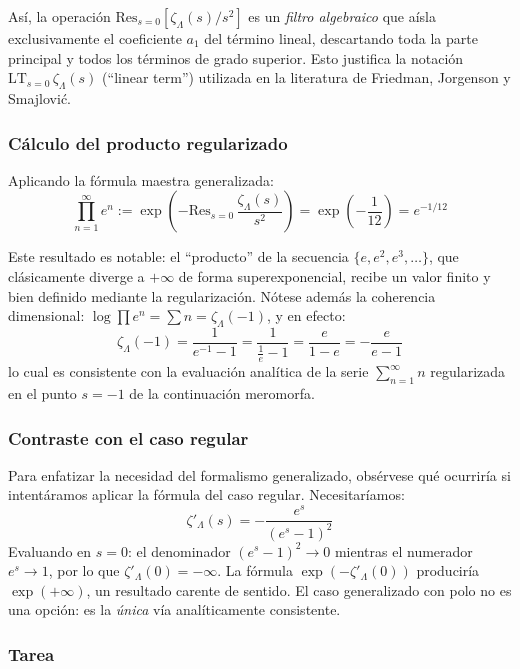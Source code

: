 Así, la operación $\text{Res}_{s=0}[\zeta_\Lambda(s)/s^2]$ es un \textit{filtro algebraico} que aísla exclusivamente el coeficiente $a_1$ del término lineal, descartando toda la parte principal y todos los términos de grado superior. Esto justifica la notación $\text{LT}_{s=0}\,\zeta_\Lambda(s)$ (``linear term'') utilizada en la literatura de Friedman, Jorgenson y Smajlovi\'c.

\subsubsection*{Cálculo del producto regularizado}

Aplicando la fórmula maestra generalizada:
$$ \prod_{n=1}^{\infty} e^n := \exp\!\left(-\text{Res}_{s=0}\,\frac{\zeta_\Lambda(s)}{s^2}\right) = \exp\!\left(-\frac{1}{12}\right) = e^{-1/12} $$

Este resultado es notable: el ``producto'' de la secuencia $\{e, e^2, e^3, \ldots\}$, que clásicamente diverge a $+\infty$ de forma superexponencial, recibe un valor finito y bien definido mediante la regularización. Nótese además la coherencia dimensional: $\log\prod e^n = \sum n = \zeta_\Lambda(-1)$, y en efecto:
$$ \zeta_\Lambda(-1) = \frac{1}{e^{-1}-1} = \frac{1}{\frac{1}{e}-1} = \frac{e}{1-e} = -\frac{e}{e-1} $$
lo cual es consistente con la evaluación analítica de la serie $\sum_{n=1}^\infty n$ regularizada en el punto $s=-1$ de la continuación meromorfa.

\subsubsection*{Contraste con el caso regular}

Para enfatizar la necesidad del formalismo generalizado, obsérvese qué ocurriría si intentáramos aplicar la fórmula del caso regular. Necesitaríamos:
$$ \zeta'_\Lambda(s) = -\frac{e^s}{(e^s-1)^2} $$
Evaluando en $s=0$: el denominador $(e^s-1)^2 \to 0$ mientras el numerador $e^s \to 1$, por lo que $\zeta'_\Lambda(0) = -\infty$. La fórmula $\exp(-\zeta'_\Lambda(0))$ produciría $\exp(+\infty)$, un resultado carente de sentido. El caso generalizado con polo no es una opción: es la \textit{única} vía analíticamente consistente.

\subsubsection*{Tarea}

